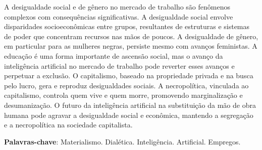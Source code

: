 \begin{titulo}
\par
A desigualdade social e de gênero no mercado de trabalho são fenômenos complexos com consequências significativas. A desigualdade social envolve disparidades socioeconômicas entre grupos, resultantes de estruturas e sistemas de poder que concentram recursos nas mãos de poucos. A desigualdade de gênero, em particular para as mulheres negras, persiste mesmo com avanços feministas. A educação é uma forma importante de ascensão social, mas o avanço da inteligência artificial no mercado de trabalho pode reverter esses avanços e perpetuar a exclusão. O capitalismo, baseado na propriedade privada e na busca pelo lucro, gera e reproduz desigualdades sociais. A necropolítica, vinculada ao capitalismo, controla quem vive e quem morre, promovendo marginalização e desumanização. O futuro da inteligência artificial na substituição da mão de obra humana pode agravar a desigualdade social e econômica, mantendo a segregação e a necropolítica na sociedade capitalista.
 \vspace{\onelineskip}
    
 \noindent
 \textbf{Palavras-chave}: Materialismo. Dialética. Inteligência. Artificial. Empregos.
\end{titulo}
\pagebreak
